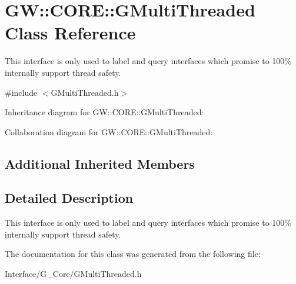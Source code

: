 \hypertarget{classGW_1_1CORE_1_1GMultiThreaded}{}\section{GW\+::C\+O\+RE\+::G\+Multi\+Threaded Class Reference}
\label{classGW_1_1CORE_1_1GMultiThreaded}


This interface is only used to label and query interfaces which promise to 100\% internally support thread safety.  




{\ttfamily \#include $<$G\+Multi\+Threaded.\+h$>$}



Inheritance diagram for GW\+::C\+O\+RE\+::G\+Multi\+Threaded\+:


Collaboration diagram for GW\+::C\+O\+RE\+::G\+Multi\+Threaded\+:
\subsection*{Additional Inherited Members}


\subsection{Detailed Description}
This interface is only used to label and query interfaces which promise to 100\% internally support thread safety. 

The documentation for this class was generated from the following file\+:\begin{DoxyCompactItemize}
\item 
Interface/\+G\+\_\+\+Core/G\+Multi\+Threaded.\+h\end{DoxyCompactItemize}
